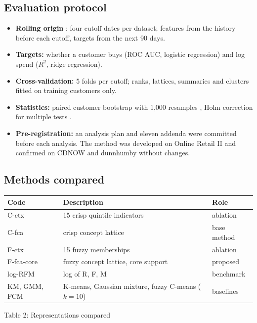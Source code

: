 \documentclass[11pt,a4paper]{article}
\begin{document}
\subsection{Evaluation protocol}
\begin{itemize}
\item \textbf{Rolling origin} \cite{tashman2000}: four cutoff dates per dataset; features from the history before each cutoff, targets from the next 90 days.
\item \textbf{Targets:} whether a customer buys (ROC AUC, logistic regression) and log spend ($R^2$, ridge regression).
\item \textbf{Cross-validation:} 5 folds per cutoff; ranks, lattices, summaries and clusters fitted on training customers only.
\item \textbf{Statistics:} paired customer bootstrap with 1,000 resamples \cite{efron1993}, Holm correction for multiple tests \cite{holm1979}.
\item \textbf{Pre-registration:} an analysis plan and eleven addenda were committed before each analysis. The method was developed on Online Retail II and confirmed on CDNOW and dunnhumby without changes.
\end{itemize}

\subsection{Methods compared}
\begin{center}
\small
\begin{tabular}{@{}lll@{}}
\toprule
Code & Description & Role \\
\midrule
C-ctx & 15 crisp quintile indicators & ablation \\
C-fca & crisp concept lattice \cite{rungruang2024} & base method \\
F-ctx & 15 fuzzy memberships & ablation \\
F-fca-core & fuzzy concept lattice, core support & proposed \\
log-RFM & log of R, F, M & benchmark \\
KM, GMM, FCM & K-means, Gaussian mixture, fuzzy C-means ($k = 10$) & baselines \\
\bottomrule
\end{tabular}\par
\vspace{4pt}Table 2: Representations compared
\end{center}

\newpage
\end{document}
